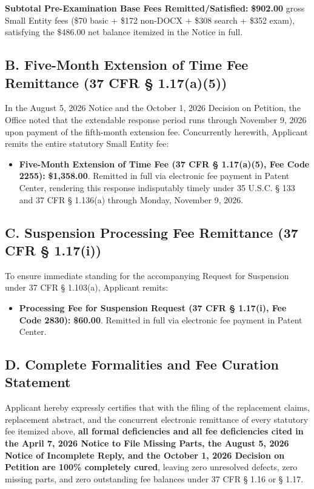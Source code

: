 \documentclass[11pt,letterpaper]{article}
\begin{document}
\noindent\textbf{Subtotal Pre-Examination Base Fees Remitted/Satisfied:} \textbf{\$902.00} gross Small Entity fees (\$70 basic + \$172 non-DOCX + \$308 search + \$352 exam), satisfying the \$486.00 net balance itemized in the Notice in full.

\subsection*{B. Five-Month Extension of Time Fee Remittance (37 CFR \S{} 1.17(a)(5))}
In the August 5, 2026 Notice and the October 1, 2026 Decision on Petition, the Office noted that the extendable response period runs through November 9, 2026 upon payment of the fifth-month extension fee. Concurrently herewith, Applicant remits the entire statutory Small Entity fee:
\begin{itemize}[leftmargin=*]
    \item \textbf{Five-Month Extension of Time Fee (37 CFR \S{} 1.17(a)(5), Fee Code 2255):} \textbf{\$1,358.00}. Remitted in full via electronic fee payment in Patent Center, rendering this response indisputably timely under 35 U.S.C. \S{} 133 and 37 CFR \S{} 1.136(a) through Monday, November 9, 2026.
\end{itemize}

\subsection*{C. Suspension Processing Fee Remittance (37 CFR \S{} 1.17(i))}
To ensure immediate standing for the accompanying Request for Suspension under 37 CFR \S{} 1.103(a), Applicant remits:
\begin{itemize}[leftmargin=*]
    \item \textbf{Processing Fee for Suspension Request (37 CFR \S{} 1.17(i), Fee Code 2830):} \textbf{\$60.00}. Remitted in full via electronic fee payment in Patent Center.
\end{itemize}

\subsection*{D. Complete Formalities and Fee Curation Statement}
Applicant hereby expressly certifies that with the filing of the replacement claims, replacement abstract, and the concurrent electronic remittance of every statutory fee itemized above, \textbf{all formal deficiencies and all fee deficiencies cited in the April 7, 2026 Notice to File Missing Parts, the August 5, 2026 Notice of Incomplete Reply, and the October 1, 2026 Decision on Petition are 100\% completely cured}, leaving zero unresolved defects, zero missing parts, and zero outstanding fee balances under 37 CFR \S{} 1.16 or \S{} 1.17.
\end{document}
